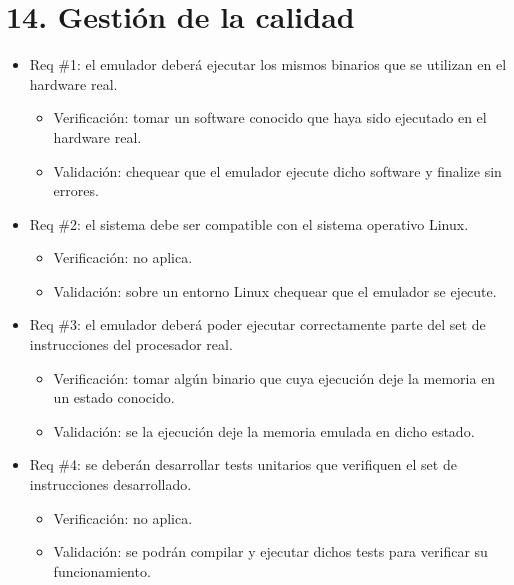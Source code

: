 
\section{14. Gestión de la calidad}
\label{sec:calidad}

\begin{itemize}

\item Req \#1: el emulador deberá ejecutar los mismos binarios que se utilizan en el hardware real.

  \begin{itemize}
  \item Verificación: tomar un software conocido que haya sido ejecutado en el hardware real.
  \item Validación: chequear que el emulador ejecute dicho software y finalize sin errores.
  \end{itemize}

\item Req \#2: el sistema debe ser compatible con el sistema operativo Linux.

  \begin{itemize}
  \item Verificación: no aplica.
  \item Validación: sobre un entorno Linux chequear que el emulador se ejecute.
  \end{itemize}

\item Req \#3: el emulador deberá poder ejecutar correctamente parte del set de instrucciones del procesador real.

  \begin{itemize}
  \item Verificación: tomar algún binario que cuya ejecución deje la memoria en un estado conocido.
  \item Validación: se la ejecución deje la memoria emulada en dicho estado.
  \end{itemize}

\item Req \#4: se deberán desarrollar tests unitarios que verifiquen el set de instrucciones desarrollado.

  \begin{itemize}
  \item Verificación: no aplica.
  \item Validación: se podrán compilar y ejecutar dichos tests para verificar su funcionamiento.
  \end{itemize}


\end{itemize}
